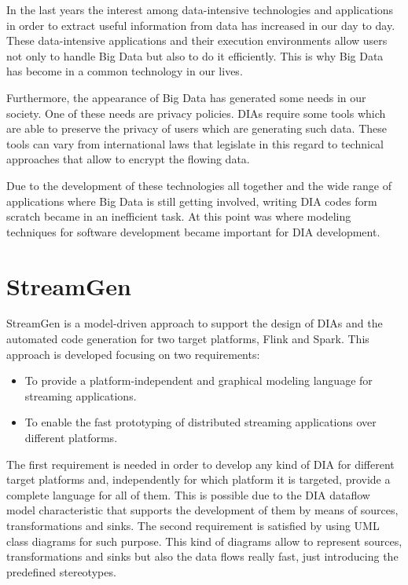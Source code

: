 In the last years the interest among data-intensive technologies and applications in order to extract useful information from data has increased in our day to day. These data-intensive applications and their execution environments allow users not only to handle Big Data but also to do it efficiently. This is why Big Data has become in a common technology in our lives.

Furthermore, the appearance of Big Data has generated some needs in our society. One of these needs are privacy policies. DIAs require some tools which are able to preserve the privacy of users which are generating such data. These tools can vary from international laws that legislate in this regard to technical approaches that allow to encrypt the flowing data.

Due to the development of these technologies all together and the wide range of applications where Big Data is still getting involved, writing DIA codes form scratch became in an inefficient task. At this point was where modeling techniques for software development became important for DIA development.


\section{StreamGen}
StreamGen is a model-driven approach to support the design of DIAs and the automated code generation for two target platforms, Flink and Spark. This approach is developed focusing on two requirements:

\begin{itemize}
\item To provide a platform-independent and graphical modeling language for streaming applications.
\item To enable the fast prototyping of distributed streaming applications over different platforms.
\end{itemize}

The first requirement is needed in order to develop any kind of DIA for different target platforms and, independently for which platform it is targeted, provide a complete language for all of them. This is possible due to the DIA dataflow model characteristic that supports the development of them by means of sources, transformations and sinks. The second requirement is satisfied by using UML class diagrams for such purpose. This kind of diagrams allow to represent sources, transformations and sinks but also the data flows really fast, just introducing the predefined stereotypes.

